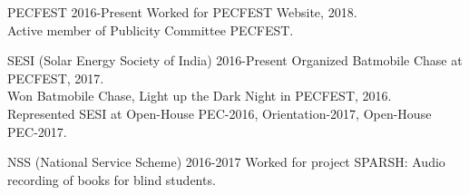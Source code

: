  
\begin{entryzlist}

\entryz

{PECFEST {}}
{2016-Present}
{\small Worked for PECFEST Website, 2018.
\\
Active member of Publicity Committee PECFEST.}

\entryz

{SESI (Solar Energy Society of India) {}}
{2016-Present}
{\small 
Organized Batmobile Chase at PECFEST, 2017.
\\
Won Batmobile Chase, Light up the Dark Night in PECFEST, 2016.
\\
Represented SESI at Open-House PEC-2016, Orientation-2017, Open-House PEC-2017.
}


\entryz

{NSS (National Service Scheme) {}}
{2016-2017}
{\small Worked for project SPARSH: 
Audio recording of books for blind students.}



\end{entryzlist}